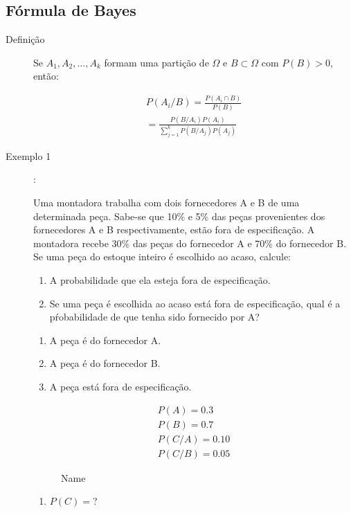 \documentclass[11pt,a4paper]{book}
\begin{document}
   \subsection{Fórmula de Bayes}
   \begin{description}
     \item [Definição] Se $A_1,A_2,\ldots, A_k$ formam uma partição de $\Omega$ e 
       $B \subset \Omega$ com $P(B)>0$, então:

       \begin{align}
         P(A_i/ B)= \frac{P(A_i \cap B)}{P(B)}\\ \nonumber
         =\frac{P(B/A_i)P(A_i)}{\sum_{j=1}^k P(B/A_j)P(A_j)}
       \end{align}

     \item [Exemplo 1]: 

       Uma montadora trabalha com dois fornecedores A e B de uma determinada peça.
       Sabe-se que 10\% e 5\% das peças provenientes dos fornecedores A e B respectivamente,
       estão fora de especificação. A montadora recebe 30\% das peças do fornecedor A e 70\%
       do fornecedor B. Se uma peça do estoque inteiro é escolhido ao acaso, calcule:

       \begin{enumerate}
         \item A probabilidade que ela esteja fora de especificação.
         \item Se uma peça é escolhida ao acaso está fora de especificação, qual é a 
           pŕobabilidade de que tenha sido fornecido por A?
       \end{enumerate}
       \begin{enumerate}[label=\Alph*:]
         \item  A peça é do fornecedor A.
         \item  A peça é do fornecedor B.
         \item  A peça está fora de especificação.
       \end{enumerate}
       \begin{align*}
         P(A)= 0.3\\
         P(B)=0.7\\
         P(C/A)= 0.10\\
         P(C/B)= 0.05
       \end{align*}
       \begin{figure}[htpb]
         \centering
         \caption{Name}
         \label{fig:21}
       \end{figure}
       \begin{enumerate}[label=(\alph*)]
         \item $P(C)=$?


\end{enumerate}
\end{description}
\end{document}

